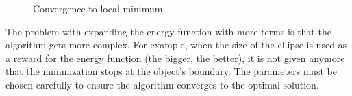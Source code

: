 \begin{figure}[h]
\begin{tabular}{cc}
    \end{tabular}
    \caption{Convergence to local minimum}
    \label{fig:ac_ellipse_gradient}
    \end{figure}

The problem with expanding the energy function with more terms is that the algorithm gets more complex. For example, when the size of the ellipse is used as a reward for the energy function (the bigger, the better), it is not given anymore that the minimization stops at the object's boundary. The parameters must be chosen carefully to ensure the algorithm converges to the optimal solution. 

